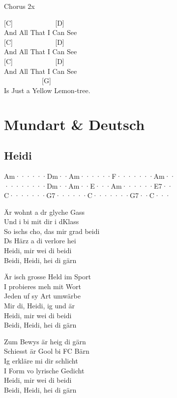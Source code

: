\documentclass[
  letterpaper,
  twoside=false]{scrbook}
\begin{document}
Chorus 2x

{[}C{]} ~ ~ ~ ~ ~ ~ ~ {[}D{]}\\
And All That I Can See\\
{[}C{]} ~ ~ ~ ~ ~ ~ ~ {[}D{]}\\
And All That I Can See\\
{[}C{]} ~ ~ ~ ~ ~ ~ ~ {[}D{]}\\
And All That I Can See\\
\hspace*{0.333em} ~ ~ ~ ~ ~ ~ ~{[}G{]}\\
Is Just a Yellow Lemon-tree.

\part{Mundart \& Deutsch}

\hypertarget{heidi}{%
\chapter{Heidi}\label{heidi}}

\textbar Am······\textbar Dm··Am··\textbar····F···\textbar····Am··\textbar{}\\
\textbar········\textbar Dm··Am··\textbar E···Am··\textbar····E7··\textbar{}\\
\textbar C·······\textbar G7······\textbar C·······\textbar G7··C···\textbar{}

Är wohnt a dr glyche Gass\\
Und i bi mit dir i d\textquotesingle Klass\\
So ischs cho, das mir grad beidi\\
Ds Härz a di verlore hei\\
Heidi, mir wei di beidi\\
Beidi, Heidi, hei di gärn

Är isch grosse Held im Sport\\
I probieres meh mit Wort\\
Jeden uf sy Art umwärbe\\
Mir di, Heidi, ig und är\\
Heidi, mir wei di beidi\\
Beidi, Heidi, hei di gärn

Zum Bewys är heig di gärn\\
Schiesst är Gool bi FC Bärn\\
Ig erkläre mi dir schlicht\\
I Form vo lyrische Gedicht\\
Heidi, mir wei di beidi\\
Beidi, Heidi, hei di gärn
\end{document}
